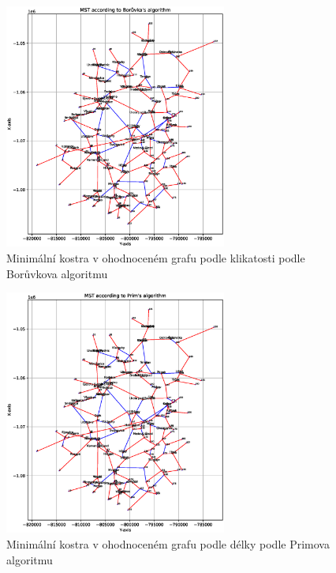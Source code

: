 \begin{figure}[H]
    \centering
    \includegraphics[width=0.65\textwidth]{images/Figure_3_curvature.eps}
    \caption{Minimální kostra v ohodnoceném grafu podle klikatosti podle Borůvkova algoritmu}
\end{figure}
\begin{figure}[H]
    \centering
    \includegraphics[width=0.65\textwidth]{images/Figure_2_curvature.eps}
    \caption{Minimální kostra v ohodnoceném grafu podle délky podle Primova algoritmu}
\end{figure}

